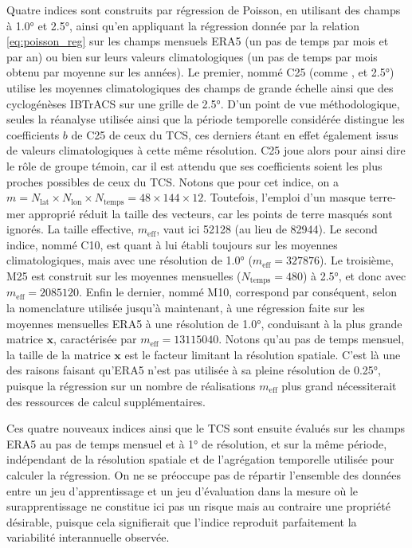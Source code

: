 \documentclass[../main.tex]{subfiles}
\begin{document}
Quatre indices sont construits par régression de Poisson, en utilisant des champs à \ang{1.0} et \ang{2.5}, ainsi qu'en appliquant la régression donnée par la
relation \ref{eq:poisson_reg} sur les champs mensuels ERA5 (un pas de temps par mois et par an) ou bien sur leurs valeurs climatologiques (un pas de temps par
mois obtenu par moyenne sur les années). Le premier, nommé C25 (comme , et \ang{2.5}) utilise les moyennes climatologiques des champs de
grande échelle ainsi que des cyclogénèses IBTrACS sur une grille de \ang{2.5}. D'un point de vue méthodologique, seules la réanalyse utilisée ainsi que la
période temporelle considérée distingue les coefficients $b$ de C25 de ceux du TCS, ces derniers étant en effet également issus de valeurs climatologiques à
cette même résolution. C25 joue alors pour ainsi dire le rôle de groupe témoin, car il est attendu que ses coefficients soient les plus proches possibles de
ceux du TCS. Notons que pour cet indice, on a $m = N_{\mathrm{lat}} \times N_{\mathrm{lon}} \times N_{\mathrm{temps}} = \num{48} \times \num{144} \times
\num{12}$. Toutefois, l'emploi d'un masque terre-mer approprié réduit la taille des vecteurs, car les points de terre masqués sont ignorés. La taille effective,
$m_{\mathrm{eff}}$, vaut ici \num{52128} (au lieu de \num{82944}). Le second indice, nommé C10, est quant à lui établi toujours sur les moyennes
climatologiques, mais avec une résolution de \ang{1.0} ($m_{\mathrm{eff}} = \num{327876}$). Le troisième, M25 est construit sur les moyennes mensuelles
($N_{\mathrm{temps}} = \num{480}$) à \ang{2.5}, et donc avec $m_{\mathrm{eff}} = \num{2085120}$. Enfin le dernier, nommé M10, correspond par conséquent, selon
la nomenclature utilisée jusqu'à maintenant, à une régression faite sur les moyennes mensuelles ERA5 à une résolution de \ang{1.0}, conduisant à la plus grande
matrice $\mathbf{x}$, caractérisée par $m_{\mathrm{eff}} = \num{13115040}$. Notons qu'au pas de temps mensuel, la taille de la matrice $\mathbf{x}$ est le
facteur limitant la résolution spatiale. C'est là une des raisons faisant qu'ERA5 n'est pas utilisée à sa pleine résolution de \ang{0.25}, puisque la régression
sur un nombre de réalisations $m_{\mathrm{eff}}$ plus grand nécessiterait des ressources de calcul supplémentaires.

Ces quatre nouveaux indices ainsi que le TCS sont ensuite évalués sur les champs ERA5 au pas de temps mensuel et à \ang{1} de résolution, et sur la même période,
indépendant de la résolution spatiale et de l'agrégation temporelle utilisée pour calculer la régression. On ne se préoccupe pas de répartir l'ensemble des
données entre un jeu d'apprentissage et un jeu d'évaluation dans la mesure où le surapprentissage ne constitue ici pas un risque mais au contraire une
propriété désirable, puisque cela signifierait que l'indice reproduit parfaitement la variabilité interannuelle observée.
\end{document}
